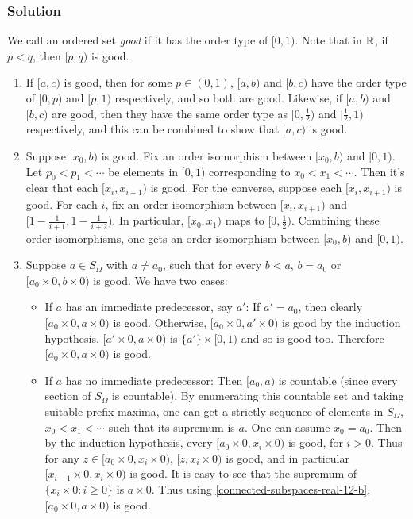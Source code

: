 \subsubsection{Solution}
We call an ordered set \emph{good} if it has the order type of $[0,1)$. Note that in $\mathbb R$, if $p < q$, then $[p,q)$ is good.
\begin{enumerate}
\item If $[a,c)$ is good, then for some $p \in (0,1)$, $[a,b)$ and $[b,c)$ have the order type  of $[0,p)$ and $[p,1)$ respectively, and so both are good. Likewise, if $[a,b)$ and $[b,c)$ are good, then they have the same order type as  $[0,\frac12)$ and $[\frac12,1)$ respectively, and this can be combined to show that $[a,c)$ is good.

\item \label{connected-subspaces-real-12-b} Suppose $[x_0, b)$ is good. Fix an order isomorphism between $[x_0, b)$ and $[0,1)$. Let $p_0 < p_1 < \cdots$ be elements in $[0,1)$ corresponding to $x_0 < x_1 < \cdots$. Then it's clear that each $[x_i, x_{i+1})$ is good. For the converse, suppose each $[x_i, x_{i+1})$ is good. For each $i$, fix an order isomorphism between $[x_i, x_{i+1})$ and $[1 - \frac{1}{i+1}, 1 - \frac{1}{i+2})$. In particular, $[x_0, x_1)$ maps to $[0, \frac12)$. Combining these order isomorphisms, one gets an order isomorphism between $[x_0,b)$ and $[0,1)$.

\item Suppose $a \in S_\Omega$ with $a \neq a_0$, such that  for every $b < a$, $b = a_0$ or $[a_0 \times 0, b \times 0)$ is good. We have two cases:
\begin{itemize}
\item If $a$ has an immediate predecessor, say $a'$: If $a' = a_0$, then clearly $[a_0 \times 0, a \times 0)$ is good. Otherwise, $[a_0 \times 0, a' \times 0)$ is good by the induction hypothesis. $[a'\times 0, a \times 0)$ is $\{a'\} \times [0,1)$ and so is good too. Therefore $[a_0 \times 0, a \times 0)$ is good. 
\item If $a$ has no immediate predecessor: Then $[a_0, a)$ is countable (since every section of $S_\Omega$ is countable). By enumerating this countable set and taking suitable prefix maxima, one can get a strictly sequence of elements in $S_\Omega$, $x_0 < x_1 < \cdots$ such that its supremum is $a$. One can assume $x_0 = a_0$. Then by the induction hypothesis, every $[a_0 \times 0, x_i \times 0)$ is good, for $i > 0$. Thus for any $z \in [a_0 \times 0, x_i \times 0)$, $[z, x_i \times 0)$ is good, and in particular $[x_{i-1} \times 0, x_i \times 0)$ is good. It is easy to see that the supremum of $\{x_i \times 0 : i \geq 0 \}$ is $a \times 0$. Thus using \ref{connected-subspaces-real-12-b}, $[a_0 \times 0, a \times 0)$ is good.
\end{itemize}


\end{enumerate}
